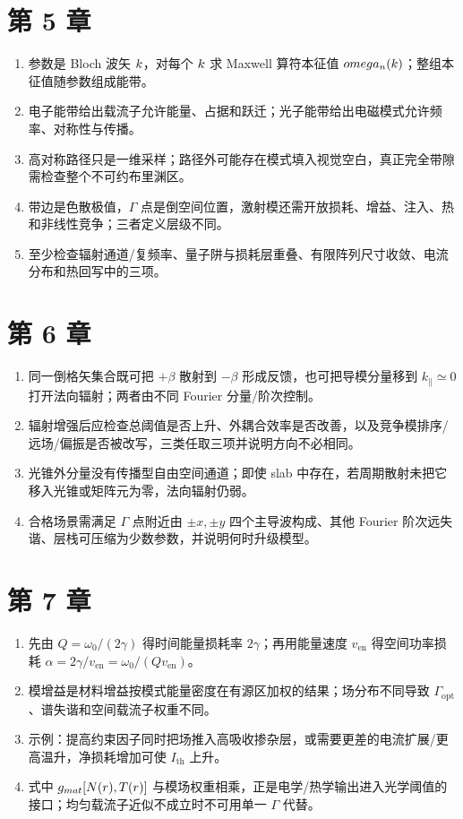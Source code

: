 \section{第 5 章}
\begin{enumerate}
  \item 参数是 Bloch 波矢 $k$，对每个 $k$ 求 Maxwell 算符本征值 $omega_n(k)$；整组本征值随参数组成能带。
  \item 电子能带给出载流子允许能量、占据和跃迁；光子能带给出电磁模式允许频率、对称性与传播。
  \item 高对称路径只是一维采样；路径外可能存在模式填入视觉空白，真正完全带隙需检查整个不可约布里渊区。
  \item 带边是色散极值，$\Gamma$ 点是倒空间位置，激射模还需开放损耗、增益、注入、热和非线性竞争；三者定义层级不同。
  \item 至少检查辐射通道/复频率、量子阱与损耗层重叠、有限阵列尺寸收敛、电流分布和热回写中的三项。
\end{enumerate}

\section{第 6 章}
\begin{enumerate}
  \item 同一倒格矢集合既可把 $+\beta$ 散射到 $-\beta$ 形成反馈，也可把导模分量移到 $k_\parallel\simeq0$ 打开法向辐射；两者由不同 Fourier 分量/阶次控制。
  \item 辐射增强后应检查总阈值是否上升、外耦合效率是否改善，以及竞争模排序/远场/偏振是否被改写，三类任取三项并说明方向不必相同。
  \item 光锥外分量没有传播型自由空间通道；即使 slab 中存在，若周期散射未把它移入光锥或矩阵元为零，法向辐射仍弱。
  \item 合格场景需满足 $\Gamma$ 点附近由 $\pm x,\pm y$ 四个主导波构成、其他 Fourier 阶次远失谐、层栈可压缩为少数参数，并说明何时升级模型。
\end{enumerate}

\section{第 7 章}
\begin{enumerate}
  \item 先由 $Q=\omega_0/(2\gamma)$ 得时间能量损耗率 $2\gamma$；再用能量速度 $v_{\mathrm{en}}$ 得空间功率损耗 $\alpha=2\gamma/v_{\mathrm{en}}=\omega_0/(Qv_{\mathrm{en}})$。
  \item 模增益是材料增益按模式能量密度在有源区加权的结果；场分布不同导致 $\Gamma_{\mathrm{opt}}$、谱失谐和空间载流子权重不同。
  \item 示例：提高约束因子同时把场推入高吸收掺杂层，或需要更差的电流扩展/更高温升，净损耗增加可使 $I_{\mathrm{th}}$ 上升。
  \item 式中 $g_{mat}[N(r),T(r)]$ 与模场权重相乘，正是电学/热学输出进入光学阈值的接口；均匀载流子近似不成立时不可用单一 $\Gamma$ 代替。
\end{enumerate}

